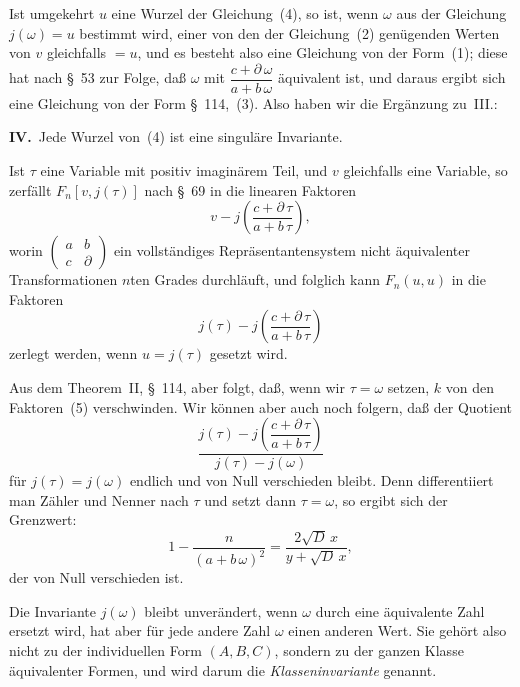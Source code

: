 \documentclass[12pt,a4paper]{article}
\theoremstyle{weber}
\begin{document}
Ist umgekehrt $u$ eine Wurzel der Gleichung~(4), so ist, wenn $\omega$ aus der Gleichung $j(\omega) = u$ bestimmt wird, einer von den der Gleichung~(2) genügenden Werten von $v$ gleichfalls $= u$, und es besteht also eine Gleichung von der Form~(1); diese hat nach \S~53 zur Folge, daß $\omega$ mit $\dfrac{c + \partial\,\omega}{a + b\,\omega}$ äquivalent ist, und daraus ergibt sich eine Gleichung von der Form \S~114,~(3). Also haben wir die Ergänzung zu~III.:

\medskip
\textbf{IV.}\ Jede Wurzel von~(4) ist eine singuläre Invariante.

\medskip
Ist $\tau$ eine Variable mit positiv imaginärem Teil, und $v$ gleichfalls eine Variable, so zerfällt $F_n[v, j(\tau)]$ nach \S~69 in die linearen Faktoren
\[
v - j\left(\frac{c + \partial\,\tau}{a + b\,\tau}\right),
\]
worin $\begin{pmatrix} a & b \\ c & \partial \end{pmatrix}$ ein vollständiges Repräsentantensystem nicht äquivalenter Transformationen $n$ten Grades durchläuft, und folglich kann $F_n(u, u)$ in die Faktoren
\begin{equation}
j(\tau) - j\left(\frac{c + \partial\,\tau}{a + b\,\tau}\right)
\end{equation}
zerlegt werden, wenn $u = j(\tau)$ gesetzt wird.

Aus dem Theorem~II, \S~114, aber folgt, daß, wenn wir $\tau = \omega$ setzen, $k$ von den Faktoren~(5) verschwinden. Wir können aber auch noch folgern, daß der Quotient
\begin{equation}
\frac{j(\tau) - j\left(\dfrac{c + \partial\,\tau}{a + b\,\tau}\right)}{j(\tau) - j(\omega)}
\end{equation}
für $j(\tau) = j(\omega)$ endlich und von Null verschieden bleibt. Denn differentiiert man Zähler und Nenner nach $\tau$ und setzt dann $\tau = \omega$, so ergibt sich der Grenzwert:
\[
1 - \frac{n}{(a + b\,\omega)^2} = \frac{2\sqrt{D}\,x}{y + \sqrt{D}\,x},
\]
der von Null verschieden ist.

Die Invariante $j(\omega)$ bleibt unverändert, wenn $\omega$ durch eine äquivalente Zahl ersetzt wird, hat aber für jede andere Zahl $\omega$ einen anderen Wert. Sie gehört also nicht zu der individuellen Form $(A, B, C)$, sondern zu der ganzen Klasse äquivalenter Formen, und wird darum die \textit{Klasseninvariante} genannt.
\end{document}
